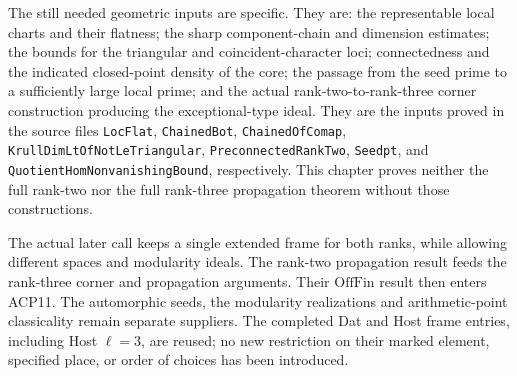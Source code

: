 The still needed geometric inputs are specific.  They are:
the representable local charts and their flatness; the sharp
component-chain and dimension estimates; the bounds for the
triangular and coincident-character loci; connectedness and
the indicated closed-point density of the core; the passage
from the seed prime to a sufficiently large local prime; and
the actual rank-two-to-rank-three corner construction producing
the exceptional-type ideal.  They are the inputs proved in
the source files \texttt{LocFlat}, \texttt{ChainedBot},
\texttt{ChainedOfComap},
\texttt{KrullDimLtOfNotLeTriangular},
\texttt{PreconnectedRankTwo}, \texttt{Seedpt}, and
\texttt{QuotientHomNonvanishingBound}, respectively.
This chapter proves neither the full rank-two nor the full
rank-three propagation theorem without those constructions.

The actual later call keeps a single extended frame for both
ranks, while allowing different spaces and modularity ideals.
The rank-two propagation result feeds the rank-three corner
and propagation arguments.  Their \(\mathrm{OffFin}\) result
then enters ACP11.  The automorphic seeds, the modularity
realizations and arithmetic-point classicality remain separate
suppliers.  The completed Dat and Host frame entries, including
Host \(\ell=3\), are reused; no new restriction on their
marked element, specified place, or order of choices has
been introduced.

